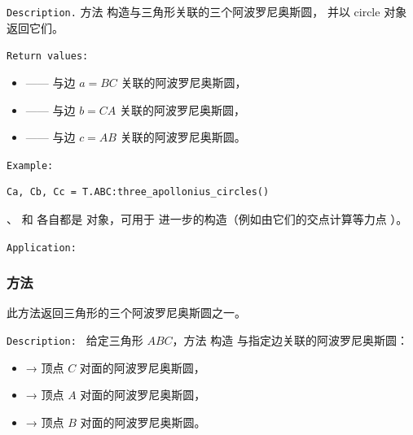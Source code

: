 \medskip
\texttt{Description.}
方法  构造与三角形关联的三个阿波罗尼奥斯圆，
并以 circle 对象返回它们。

\medskip
\texttt{Return values: }
\begin{itemize}
  \item {} —— 与边 $a = BC$ 关联的阿波罗尼奥斯圆，
  \item {} —— 与边 $b = CA$ 关联的阿波罗尼奥斯圆，
  \item {} —— 与边 $c = AB$ 关联的阿波罗尼奥斯圆。
\end{itemize}

\medskip
\texttt{Example: }
\begin{verbatim}
Ca, Cb, Cc = T.ABC:three_apollonius_circles()
\end{verbatim}

、 和  各自都是  对象，可用于
进一步的构造（例如由它们的交点计算等力点
）。

\medskip
\texttt{Application: }

\begin{tkzexample}[vbox]
\begin{center}
\end{center}
\end{tkzexample}

\subsubsection{方法 }
\label{ssub:apollonius_circle}

此方法返回三角形的三个阿波罗尼奥斯圆之一。

\medskip

\texttt{Description: }
给定三角形 $ABC$，方法  构造
与指定边关联的阿波罗尼奥斯圆：
\begin{itemize}
  \item {} → 顶点 $C$ 对面的阿波罗尼奥斯圆，
  \item {} → 顶点 $A$ 对面的阿波罗尼奥斯圆，
  \item {} → 顶点 $B$ 对面的阿波罗尼奥斯圆。
\end{itemize}

